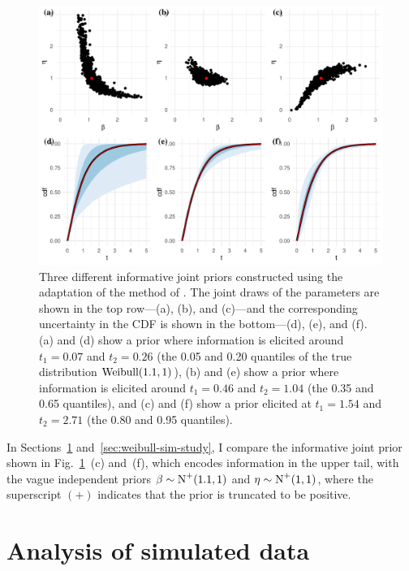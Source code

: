 \begin{figure}
    \centering
    \includegraphics[width=1\textwidth]{./figures/ch-2/joint-priors.pdf}
    \caption{Three different informative joint priors constructed using the adaptation of the method of \citet{kaminskiy2005}. The joint draws of the parameters are shown in the top row---(a), (b), and (c)---and the corresponding uncertainty in the CDF is shown in the bottom---(d), (e), and (f). (a) and (d) show a prior where information is elicited around $t_1 = 0.07$ and $t_2 = 0.26$ (the 0.05 and 0.20 quantiles of the true distribution $\hbox{Weibull}(1.1, 1)$), (b) and (e) show a prior where information is elicited around $t_1 = 0.46$ and $t_2 = 1.04$ (the 0.35 and 0.65 quantiles), and (c) and (f) show a prior elicited at $t_1 = 1.54$ and $t_2 = 2.71$ (the 0.80 and 0.95 quantiles).}
    \label{fig:kaminskiy-join-priors}
\end{figure}

In Sections~\ref{sec:weibull-sim-example} and~\ref{sec:weibull-sim-study}, I compare the informative joint prior shown in Fig.~\ref{fig:kaminskiy-join-priors}~(c) and~(f), which encodes information in the upper tail, with the vague independent priors $\beta \sim \hbox{N}^{+}(1.1, 1)$ and $\eta \sim \hbox{N}^{+}(1, 1)$, where the superscript $(+)$ indicates that the prior is truncated to be positive. 

\section{Analysis of simulated data} \label{sec:weibull-sim-example}

